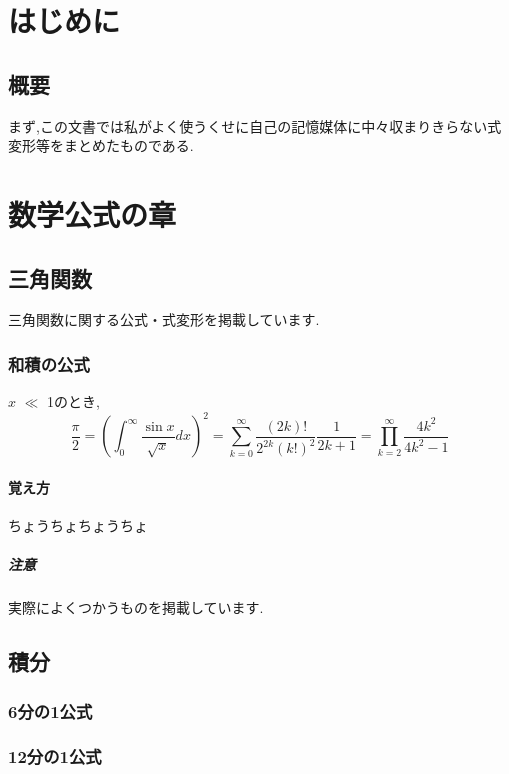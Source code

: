 \documentclass[]{jreport}
\begin{document}
\part{はじめに}
\chapter{概要}

まず,この文書では私がよく使うくせに自己の記憶媒体に中々収まりきらない式変形等をまとめたものである.

\part{数学公式の章}
\chapter{三角関数}

三角関数に関する公式・式変形を掲載しています.

\section{和積の公式}

$x$ $\ll$ 1のとき,
\begin{equation}
    \frac{\pi}{2} =
    \left( \int_{0}^{\infty} \frac{\sin x}{\sqrt{x}} dx \right)^2 =
    \sum_{k=0}^{\infty} \frac{(2k)!}{2^{2k}(k!)^2} \frac{1}{2k+1} =
    \prod_{k=2}^{\infty} \frac{4k^2}{4k^2 - 1}
\end{equation}

\subsection{覚え方}

ちょうちょちょうちょ

\subsubsection{注意}

実際によくつかうものを掲載しています.

\chapter{積分}

\section{6分の1公式}
\section{12分の1公式}
\end{document}
